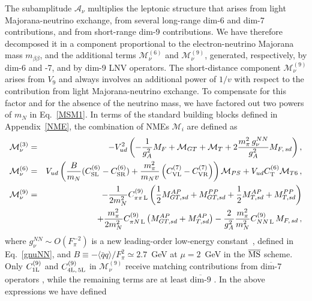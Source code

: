\documentclass[letterpaper,11pt]{article}
\newcommand{\sq}{^{2}}
\newcommand{\nn}{\nonumber}
\newcommand{\textoverline}[1]{$\overline{\mbox{#1}}$}
\begin{document}
The subamplitude $\mathcal A_\nu$  multiplies the leptonic structure that arises from light Majorana-neutrino exchange,  from several long-range dim-6 and dim-7 contributions, and from short-range dim-9 contributions. We have therefore decomposed it in a component proportional to the electron-neutrino Majorana mass $m_{\beta\beta}$, and the additional terms  $\mathcal M^{(6)}_{\nu}$
and $\mathcal M^{(9)}_{\nu}$, generated, respectively, by dim-6 and -7, and by dim-9 LNV operators.
The short-distance component $\mathcal M^{(9)}_{\nu}$ arises from $V_9$ and always involves an additional power of $1/v$ with respect to the contribution from light Majorana-neutrino exchange. To compensate for this factor and for the absence of the neutrino mass, we have factored out two powers of $m_N$ in Eq.~\eqref{MSM1}.
In terms of the standard building blocks  defined in Appendix~\ref{NME}, 
the combination of NMEs $\mathcal M_i$ are defined as
\begin{eqnarray}\label{MSMstandard}
\mathcal M^{(3)}_{\nu}  & = & - V_{ud}^2 \left(  - \frac{1}{g_A^2} M_{F} +   \mathcal M_{GT}   +   \mathcal M_{T}  + 2 \frac{m_\pi^2 \, g_\nu^{NN}}{g_A^2} M_{F,\, sd}  \right), \\
 \mathcal M^{(6)}_{\nu} &=&   V_{ud}
\left( \frac{B}{m_N} (C^{(6)}_{\rm SL}  - C^{(6)}_{\rm SR} ) + \frac{m^2_\pi}{m_N v} \left( C^{(7)}_{\rm VL} - C^{(7)}_{\rm VR}\right) \right)  \mathcal M_{PS} + V_{ud} C^{(6)}_{\rm T}   \mathcal M_{T6}\,,\\
 \mathcal M^{(9)}_{\nu} &=& - \frac{1}{2 m_N^2} C_{\pi\pi \,\rm L}^{(9)} \left(\frac{1}{2} M^{AP}_{GT, sd} + M^{PP}_{GT, sd}
+ \frac{1}{2} M^{AP}_{T, sd} + M^{PP}_{T, sd}\right) \nn \\ & &  +   \frac{m_\pi^2}{2 m_N^2} C^{(9)}_{\pi N\, \rm L}   \left(M^{AP}_{GT, sd} + M^{AP}_{T, sd} \right)
- \frac{2}{g_A\sq} \frac{m_\pi^2}{m_N^2}C_{NN\, \rm L}^{(9)}\,  M_{F,\,sd}\,,
\end{eqnarray}
where $g_\nu^{NN} \sim O(F_\pi^{-2})$ is a new leading-order low-energy constant~\cite{Cirigliano:2018hja},
defined in Eq.\ \eqref{gnuNN}, and $B \equiv - \langle \bar{q} q \rangle/F_\pi^2  \simeq 2.7$~GeV at $\mu=2$~GeV in the $\overline{\rm MS}$ scheme. 
Only $C^{(9)}_{\rm 1L}$ and $C^{(9)}_{\rm 4L,\,5L}$ in $ \mathcal M^{(9)}_{\nu}$ receive matching contributions from  \textoverline{dim-7} operators \cite{Cirigliano:2017djv}, while the remaining terms are at least  \textoverline{dim-9} \cite{Graesser:2016bpz}. 
In the above expressions we have defined
\end{document}
